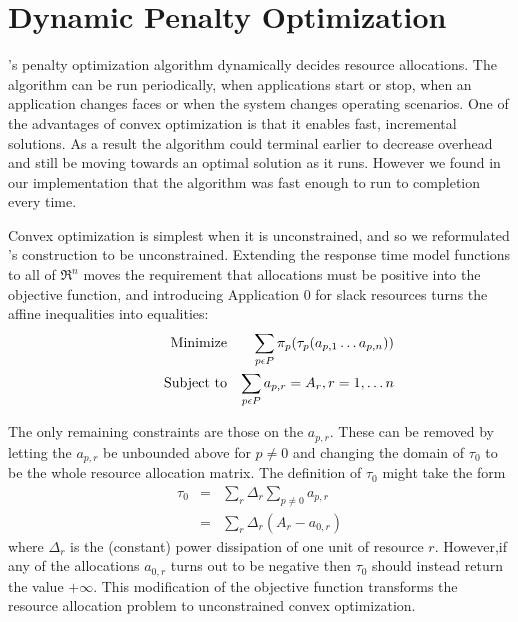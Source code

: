 \section{Dynamic Penalty Optimization}\label{dyn_opt}


\pacora's penalty optimization algorithm dynamically decides resource allocations. The algorithm can be run periodically, when applications start or stop, when an application changes faces or when the system changes operating scenarios.  One of the advantages of convex optimization is that it enables fast, incremental solutions.  As a result the algorithm could terminal earlier to decrease overhead and still be moving towards an optimal solution as it runs.  However we found in our implementation that the algorithm was fast enough to run to completion every time. 

Convex optimization is simplest when it is unconstrained, and so we reformulated \pacora's construction to be unconstrained.
Extending the response time model functions to all of $\Re^n$
moves the requirement that allocations must be positive into the objective function,
and introducing Application 0 for slack resources turns the affine inequalities into equalities:
\begin{eqnarray*}
& \makebox[1in][r]{Minimize}   & \sum_{p\epsilon P} {\pi_p(\tau_p(a_{p,1}\ldots a_{p,n}))}  \\
& \makebox[1in][r]{Subject to} & \sum_{p\epsilon P} a_{p,r} = A_r, r = 1,\ldots n           \\
\end{eqnarray*}

The only remaining constraints are those on the $a_{p,r}$.
These can be removed by letting the $a_{p,r}$ be unbounded above for $p \neq 0$
and changing the domain of $\tau_0$  to be the whole resource allocation matrix.
The definition of $\tau_0$ might take the form
\begin{eqnarray*}
\tau_0 &=& \sum_r \Delta_r \sum_{p \neq 0} a_{p,r}     \\
       &=& \sum_r \Delta_r (A_r - a_{0,r})
\end{eqnarray*}
where $\Delta_r$ is the (constant) power dissipation of one unit of resource $r$.
However,if any of the allocations $a_{0,r}$ turns out to be negative then $\tau_0$  should instead return the value $+\infty$.
This modification of the objective function transforms the resource allocation problem
to unconstrained convex optimization.  


